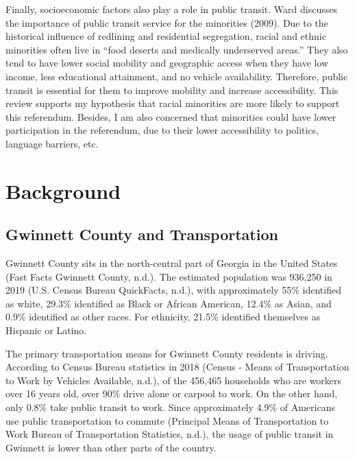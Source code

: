 \documentclass[
]{article}
\begin{document}
Finally, socioeconomic factors also play a role in public transit. Ward
discusses the importance of public transit service for the minorities
(2009). Due to the historical influence of redlining and residential
segregation, racial and ethnic minorities often live in ``food deserts
and medically underserved areas.'' They also tend to have lower social
mobility and geographic access when they have low income, less
educational attainment, and no vehicle availability. Therefore, public
transit is essential for them to improve mobility and increase
accessibility. This review supports my hypothesis that racial minorities
are more likely to support this referendum. Besides, I am also concerned
that minorities could have lower participation in the referendum, due to
their lower accessibility to politics, language barriers, etc.

\hypertarget{background}{%
\section{Background}\label{background}}

\hypertarget{gwinnett-county-and-transportation}{%
\subsection{Gwinnett County and
Transportation}\label{gwinnett-county-and-transportation}}

Gwinnett County sits in the north-central part of Georgia in the United
States (Fast Facts \textbar{} Gwinnett County, n.d.). The estimated
population was 936,250 in 2019 (U.S. Census Bureau QuickFacts, n.d.),
with approximately 55\% identified as white, 29.3\% identified as Black
or African American, 12.4\% as Asian, and 0.9\% identified as other
races. For ethnicity, 21.5\% identified themselves as Hispanic or
Latino.

The primary transportation means for Gwinnett County residents is
driving. According to Census Bureau statistics in 2018 (Census - Means
of Transportation to Work by Vehicles Available, n.d.), of the 456,465
households who are workers over 16 years old, over 90\% drive alone or
carpool to work. On the other hand, only 0.8\% take public transit to
work. Since approximately 4.9\% of Americans use public transportation
to commute (Principal Means of Transportation to Work \textbar{} Bureau
of Transportation Statistics, n.d.), the usage of public transit in
Gwinnett is lower than other parts of the country.
\end{document}
